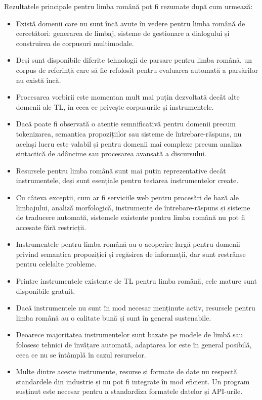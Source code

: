 \documentclass[]{../../metanetpaper}
\begin{document}
\begin{multicols}{2}
Rezultatele principale pentru limba română pot fi rezumate după cum urmează:

\begin{itemize}
\item Există domenii care nu sunt încă avute în vedere pentru limba română de cercetători: generarea de limbaj, sisteme de gestionare a dialogului și construirea de corpusuri multimodale.
\item Deși sunt disponibile diferite tehnologii de parsare pentru limba română, un corpus de referință care să fie refolosit pentru evaluarea automată a parsărilor nu există încă.
\item Procesarea vorbirii este momentan mult mai puțin dezvoltată decât alte domenii ale TL, în ceea ce privește corpusurile și instrumentele.
\item Dacă poate fi observată o atenție semnificativă pentru domenii precum tokenizarea, semantica propozițiilor sau sisteme de întrebare-răspuns, nu același lucru este valabil și pentru domenii mai complexe precum analiza sintactică de adâncime sau procesarea avansată a discursului.
\item Resursele pentru limba română sunt mai puțin reprezentative decât instrumentele, deși sunt esențiale pentru testarea instrumentelor create. 
\item Cu câteva excepții, cum ar fi serviciile web pentru procesări de bază ale limbajului, analiză morfologică, instrumente de întrebare-răspuns și sisteme de traducere automată, sistemele existente pentru limba română nu pot fi accesate fără restricții. 
\item Instrumentele pentru limba română au o acoperire largă pentru domenii privind semantica propoziției și regăsirea de informații, dar sunt restrânse pentru celelalte probleme.
\item Printre instrumentele existente de TL pentru limba română, cele mature sunt disponibile gratuit.
\item Dacă instrumentele nu sunt în mod necesar menținute activ, resursele pentru limba română au o calitate bună și sunt în general sustenabile.
\item Deoarece majoritatea instrumentelor sunt bazate pe modele de limbă sau folosesc tehnici de învățare automată, adaptarea lor este în general posibilă, ceea ce nu se întâmplă în cazul resurselor.
\item Multe dintre aceste instrumente, resurse și formate de date nu respectă standardele din industrie și nu pot fi integrate în mod eficient. Un program susținut este necesar pentru a standardiza formatele datelor și API-urile.

\end{itemize}
\end{multicols}
\end{document}
